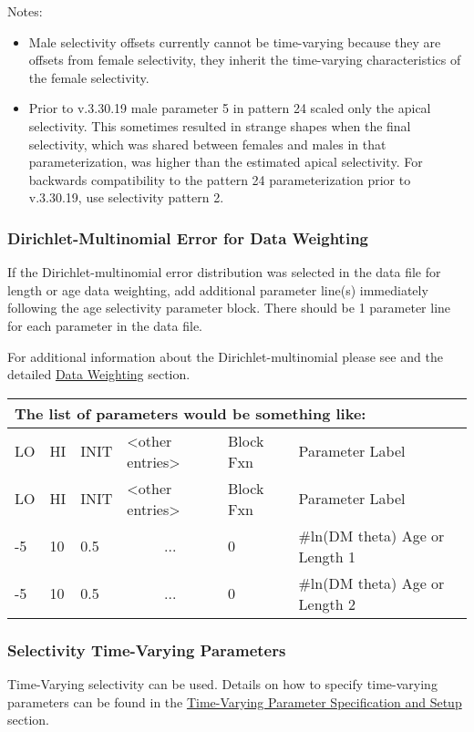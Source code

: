 Notes:
\begin{itemize}
	\item Male selectivity offsets currently cannot be time-varying because they are offsets from female selectivity, they inherit the time-varying characteristics of the female selectivity.
    \item Prior to v.3.30.19 male parameter 5 in pattern 24 scaled only the apical selectivity. This sometimes resulted in strange shapes when the final selectivity, which was shared between females and males in that parameterization, was higher than the estimated apical selectivity. For backwards compatibility to the pattern 24 parameterization prior to v.3.30.19, use selectivity pattern 2.
\end{itemize}

\hypertarget{Dirichletparameter}{}
\subsubsection{Dirichlet-Multinomial Error for Data Weighting}
If the Dirichlet-multinomial error distribution was selected in the data file for length or age data weighting, add additional parameter line(s) immediately following the age selectivity parameter block. There should be 1 parameter line for each parameter in the data file.

For additional information about the Dirichlet-multinomial please see \citet{thorson-model-based-2017} and the detailed \hyperlink{DataWeight}{Data Weighting} section.

	
\begin{longtable}{p{1cm} p{1cm} p{1cm} p{2.9cm} p{1.8cm} p{6.5cm}}
	\multicolumn{6}{l}{The list of parameters would be something like:} \\
	\hline
	LO \Tstrut & HI & INIT & <other entries> & Block Fxn & Parameter Label \Bstrut\\
	\hline
	\endfirsthead
	
	\hline
	LO \Tstrut & HI & INIT & <other entries> & Block Fxn & Parameter Label \Bstrut\\
	\hline
	\endhead

	-5 & 10 & 0.5 & \multicolumn{1}{c}{...} & 0 & \#ln(DM theta) Age or Length 1 \Tstrut\\
	-5 & 10 & 0.5 & \multicolumn{1}{c}{...} & 0 & \#ln(DM theta) Age or Length 2 \Bstrut\\
	\hline
\end{longtable}


\subsubsection{Selectivity Time-Varying Parameters}
Time-Varying selectivity can be used. Details on how to specify time-varying parameters can be found in the \hyperlink{tvOrder}{Time-Varying Parameter Specification and Setup} section.

